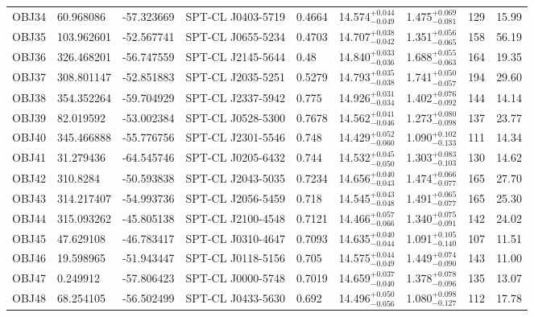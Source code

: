 \documentclass[apj,twocolumn]{emulateapj}
\begin{document}
{\begin{table}[h!]
\begin{tabular}{l l l l l c c c c}
 OBJ34 & 60.968086  & -57.323669 &  SPT-CL J0403-5719      & 0.4664 & 14.574$^{+0.044}_{-0.049}$ & 1.475$^{+0.069}_{-0.081}$ &   129 & 15.99 \\
 OBJ35 & 103.962601 & -52.567741 &  SPT-CL J0655-5234      & 0.4703 & 14.707$^{+0.038}_{-0.042}$ & 1.351$^{+0.056}_{-0.065}$ &   158 & 56.19 \\
 OBJ36 & 326.468201 & -56.747559 &  SPT-CL J2145-5644      & 0.48   & 14.840$^{+0.033}_{-0.036}$ & 1.688$^{+0.055}_{-0.063}$ &   164 & 19.35 \\
 OBJ37 & 308.801147 & -52.851883 &  SPT-CL J2035-5251      & 0.5279 & 14.793$^{+0.035}_{-0.038}$ & 1.741$^{+0.050}_{-0.057}$ &   194 & 29.60 \\
 OBJ38 & 354.352264 & -59.704929 &  SPT-CL J2337-5942      & 0.775  & 14.926$^{+0.031}_{-0.034}$ & 1.402$^{+0.076}_{-0.092}$ &   144 & 14.14 \\
 OBJ39 & 82.019592  & -53.002384 &  SPT-CL J0528-5300      & 0.7678 & 14.562$^{+0.041}_{-0.046}$ & 1.273$^{+0.080}_{-0.098}$ &   137 & 23.77 \\
 OBJ40 & 345.466888 & -55.776756 &  SPT-CL J2301-5546      & 0.748  & 14.429$^{+0.052}_{-0.060}$ & 1.090$^{+0.102}_{-0.133}$ &   111 & 14.34 \\
 OBJ41 & 31.279436  & -64.545746 &  SPT-CL J0205-6432      & 0.744  & 14.532$^{+0.045}_{-0.050}$ & 1.303$^{+0.083}_{-0.103}$ &   130 & 14.62 \\
 OBJ42 & 310.8284   & -50.593838 &  SPT-CL J2043-5035      & 0.7234 & 14.656$^{+0.040}_{-0.043}$ & 1.474$^{+0.066}_{-0.077}$ &   165 & 27.70 \\
 OBJ43 & 314.217407 & -54.993736 &  SPT-CL J2056-5459      & 0.718  & 14.545$^{+0.043}_{-0.048}$ & 1.491$^{+0.065}_{-0.077}$ &   165 & 25.30 \\
 OBJ44 & 315.093262 & -45.805138 &  SPT-CL J2100-4548      & 0.7121 & 14.466$^{+0.057}_{-0.066}$ & 1.340$^{+0.075}_{-0.091}$ &   142 & 24.02 \\
 OBJ45 & 47.629108  & -46.783417 &  SPT-CL J0310-4647      & 0.7093 & 14.635$^{+0.040}_{-0.044}$ & 1.091$^{+0.105}_{-0.140}$ &   107 & 11.51 \\
 OBJ46 & 19.598965  & -51.943447 &  SPT-CL J0118-5156      & 0.705  & 14.575$^{+0.044}_{-0.049}$ & 1.449$^{+0.074}_{-0.090}$ &   143 & 11.00 \\
 OBJ47 & 0.249912   & -57.806423 &  SPT-CL J0000-5748      & 0.7019 & 14.659$^{+0.037}_{-0.040}$ & 1.378$^{+0.078}_{-0.096}$ &   135 & 13.07 \\
 OBJ48 & 68.254105  & -56.502499 &  SPT-CL J0433-5630      & 0.692  & 14.496$^{+0.050}_{-0.056}$ & 1.080$^{+0.098}_{-0.127}$ &   112 & 17.78 \\

\end{tabular}
\end{table}}
\end{document}
